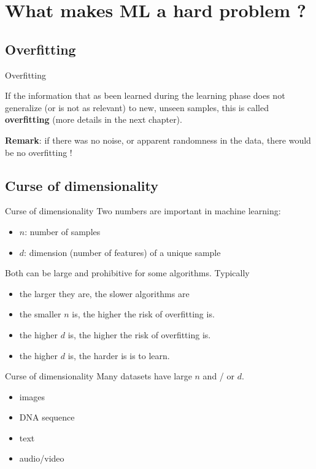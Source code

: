 \documentclass[usenames,dvipsnames]{beamer}
\begin{document}
\section{What makes ML a hard problem ?}
\frame{\tableofcontents[currentsection]}

\subsection{Overfitting}

\begin{frame}{Overfitting}

    If the information that as been learned during the learning phase does not generalize (or is not as relevant) to new, unseen samples, this is called \textbf{overfitting} (more details in the next chapter).

    \textbf{Remark}: if there was no noise, or apparent randomness in the data, there would be no overfitting !

\end{frame}

\subsection{Curse of dimensionality}%
\label{sub:curse_of_dimensionality}

\begin{frame}{Curse of dimensionality}
   Two numbers are important in machine learning:
    \begin{itemize}
        \item $n$: number of samples
        \item $d$: dimension (number of features) of a unique sample
    \end{itemize}

    Both can be large and prohibitive for some algorithms. Typically
    \begin{itemize}
    	\item the larger they are, the slower algorithms are
	\item the smaller $n$ is, the higher the risk of overfitting is.
	\item the higher $d$ is, the higher the risk of overfitting is.
	\item the higher $d$ is, the harder is is to learn.
    \end{itemize}
\end{frame}

\begin{frame}{Curse of dimensionality}
    Many datasets have large $n$ and / or $d$.

            \begin{itemize}
                \item images
                \item DNA sequence
                \item text
                \item audio/video
            \end{itemize}
\end{frame}
\end{document}
